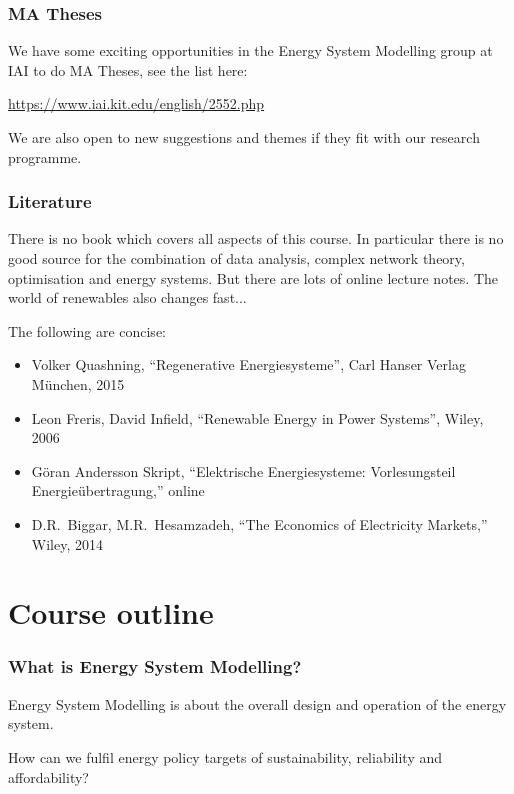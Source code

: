 \documentclass[10pt,aspectratio=169,dvipsnames]{beamer}
\let\olditem\item
\renewcommand{\item}{%
\olditem\vspace{5pt}}
\begin{document}
\begin{frame}
  \frametitle{MA Theses}

  We have some exciting opportunities in the Energy System Modelling
  group at IAI to do MA Theses, see the list here:

  \url{https://www.iai.kit.edu/english/2552.php}

  We are also open to new suggestions and themes if they fit with our
  research programme.

\end{frame}

\begin{frame}
  \frametitle{Literature}

  There is no book which covers all aspects of this course. In particular there is no good source for the combination of data analysis, complex network theory, optimisation and energy systems. But there are lots of online lecture notes. The world of renewables also changes fast...

  The following are concise:
  \begin{itemize}
    \item Volker Quashning, ``Regenerative Energiesysteme'', Carl Hanser Verlag München, 2015
      \item      Leon Freris, David Infield, ``Renewable Energy in Power Systems'', Wiley, 2006
      \item Göran Andersson Skript, ``Elektrische Energiesysteme: Vorlesungsteil Energieübertragung,'' online
          \item D.R.~Biggar, M.R.~Hesamzadeh, ``The Economics of Electricity
  Markets,'' Wiley, 2014
  \end{itemize}

\end{frame}




\section{Course outline}


\begin{frame}
  \frametitle{What is Energy System Modelling?}

  \alert{Energy System Modelling} is about the overall \alert{design} and \alert{operation} of the energy system.

  How can we fulfil energy policy targets
  of \alert{sustainability}, \alert{reliability} and
  \alert{affordability}?

\vspace{1cm}
  \centering


\end{frame}
\end{document}
